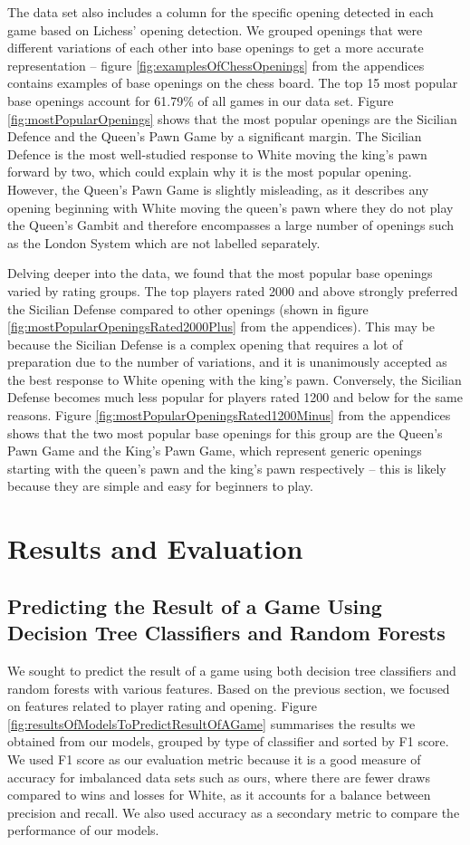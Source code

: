 \documentclass[a4paper, 11pt]{article}
\begin{document}
The data set also includes a column for the specific opening detected in each game based on Lichess' opening detection. We grouped openings that were different variations of each other into base openings to get a more accurate representation -- figure \ref{fig:examplesOfChessOpenings} from the appendices contains examples of base openings on the chess board. The top 15 most popular base openings account for 61.79\% of all games in our data set. Figure \ref{fig:mostPopularOpenings} shows that the most popular openings are the Sicilian Defence and the Queen's Pawn Game by a significant margin. The Sicilian Defence is the most well-studied response to White moving the king's pawn forward by two, which could explain why it is the most popular opening. However, the Queen's Pawn Game is slightly misleading, as it describes any opening beginning with White moving the queen's pawn where they do not play the Queen's Gambit and therefore encompasses a large number of openings such as the London System which are not labelled separately.

Delving deeper into the data, we found that the most popular base openings varied by rating groups. The top players rated 2000 and above strongly preferred the Sicilian Defense compared to other openings (shown in figure \ref{fig:mostPopularOpeningsRated2000Plus} from the appendices). This may be because the Sicilian Defense is a complex opening that requires a lot of preparation due to the number of variations, and it is unanimously accepted as the best response to White opening with the king's pawn. Conversely, the Sicilian Defense becomes much less popular for players rated 1200 and below for the same reasons. Figure \ref{fig:mostPopularOpeningsRated1200Minus} from the appendices shows that the two most popular base openings for this group are the Queen's Pawn Game and the King's Pawn Game, which represent generic openings starting with the queen's pawn and the king's pawn respectively -- this is likely because they are simple and easy for beginners to play.

\section{Results and Evaluation}

\subsection{Predicting the Result of a Game Using Decision Tree Classifiers and Random Forests}
We sought to predict the result of a game using both decision tree classifiers and random forests with various features. Based on the previous section, we focused on features related to player rating and opening. Figure \ref{fig:resultsOfModelsToPredictResultOfAGame} summarises the results we obtained from our models, grouped by type of classifier and sorted by F1 score. We used F1 score as our evaluation metric because it is a good measure of accuracy for imbalanced data sets such as ours, where there are fewer draws compared to wins and losses for White, as it accounts for a balance between precision and recall. We also used accuracy as a secondary metric to compare the performance of our models.
\end{document}
